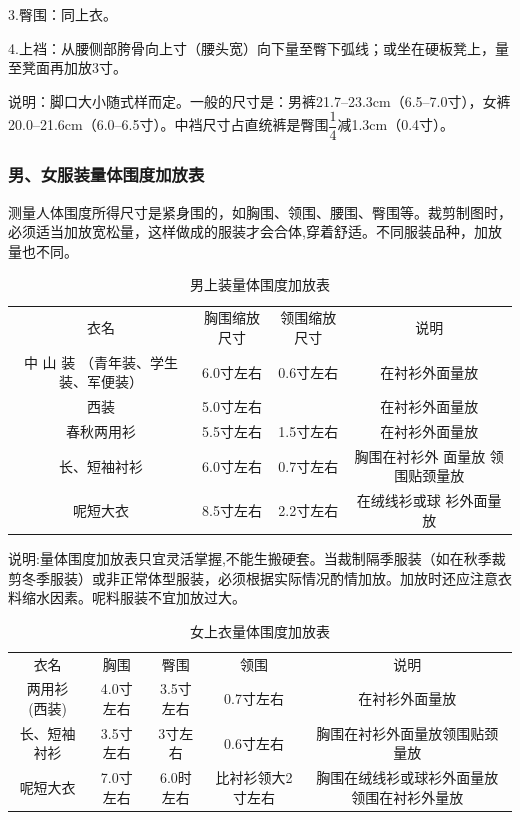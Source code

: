 \documentclass{ctexbook}
\begin{document}
3.臀围：同上衣。

4.上裆：从腰侧部胯骨向上寸（腰头宽）向下量至臀下弧线；或坐在硬板凳上，量至凳面再加放3寸。

说明：脚口大小随式样而定。一般的尺寸是：男裤21.7--23.3cm（6.5--7.0寸），女裤20.0--21.6cm（6.0--6.5寸）。中裆尺寸占直统裤是臀围$\dfrac{1}{4}$减1.3cm（0.4寸）。
\subsubsection{男、女服装量体围度加放表}
测量人体围度所得尺寸是紧身围的，如胸围、领围、腰围、臀围等。裁剪制图时，必须适当加放宽松量，这样做成的服装才会合体,穿着舒适。不同服装品种，加放量也不同。
\begin{table}[htbp]
	\centering
	\caption{男上装量体围度加放表}
	\begin{tabular}{cccc}
		衣名    & 胸围缩放尺寸 & 领围缩放尺寸 & 说明 \\
		中 山 装 （青年装、学生 装、军便装） & 6.0寸左右 & 0.6寸左右 & 在衬衫外面量放 \\
		西装    & 5.0寸左右 &       & 在衬衫外面量放 \\
		春秋两用衫 & 5.5寸左右 & 1.5寸左右 & 在衬衫外面量放 \\
		长、短袖衬衫 & 6.0寸左右 & 0.7寸左右 & 胸围在衬衫外 面量放 领围贴颈量放 \\
		呢短大衣  & 8.5寸左右 & 2.2寸左右 & 在绒线衫或球 衫外面量放 \\
	\end{tabular}%
	\label{tab:suofang}%
\end{table}%
说明:量体围度加放表只宜灵活掌握,不能生搬硬套。当裁制隔季服装（如在秋季裁剪冬季服装）或非正常体型服装，必须根据实际情况酌情加放。加放时还应注意衣料缩水因素。呢料服装不宜加放过大。
\begin{table}[htbp]
	\centering
	\caption{女上衣量体围度加放表}
	\begin{tabular}{ccccc}
		衣名    & 胸围    & 臀围    & 领围    & 说明 \\
		两用衫 (西装) & 4.0寸左右 & 3.5寸左右 & 0.7寸左右 & 在衬衫外面量放 \\
		长、短袖衬衫 & 3.5寸左右 & 3寸左右  & 0.6寸左右 & 胸围在衬衫外面量放领围贴颈量放 \\
		呢短大衣  & 7.0寸左右 & 6.0时左右 & 比衬衫领大2寸左右 & 胸围在绒线衫或球衫外面量放领围在衬衫外量放 \\
	\end{tabular}%
	\label{tab:nvshangyi}%
\end{table}%
\end{document}
